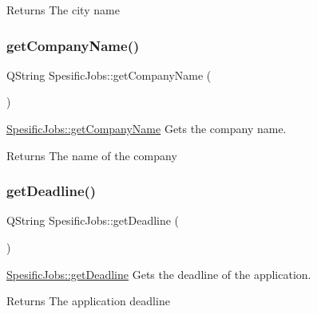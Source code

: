 \begin{DoxyReturn}{Returns}
The city name 
\end{DoxyReturn}
\mbox{\label{class_spesific_jobs_a51afafde9872e78e8b09e3bc00a2a161}} 
\subsubsection{\texorpdfstring{get\+Company\+Name()}{getCompanyName()}}
{\footnotesize\ttfamily Q\+String Spesific\+Jobs\+::get\+Company\+Name (\begin{DoxyParamCaption}{ }\end{DoxyParamCaption})}



\hyperlink{class_spesific_jobs_a51afafde9872e78e8b09e3bc00a2a161}{Spesific\+Jobs\+::get\+Company\+Name} Gets the company name. 

\begin{DoxyReturn}{Returns}
The name of the company 
\end{DoxyReturn}
\mbox{\label{class_spesific_jobs_a4744022c02271fabfb7fca0015896c09}} 
\subsubsection{\texorpdfstring{get\+Deadline()}{getDeadline()}}
{\footnotesize\ttfamily Q\+String Spesific\+Jobs\+::get\+Deadline (\begin{DoxyParamCaption}{ }\end{DoxyParamCaption})}



\hyperlink{class_spesific_jobs_a4744022c02271fabfb7fca0015896c09}{Spesific\+Jobs\+::get\+Deadline} Gets the deadline of the application. 

\begin{DoxyReturn}{Returns}
The application deadline 
\end{DoxyReturn}
\mbox{\label{class_spesific_jobs_afe77ad902d3e9f3cfd5f057e0a37a193}} 
